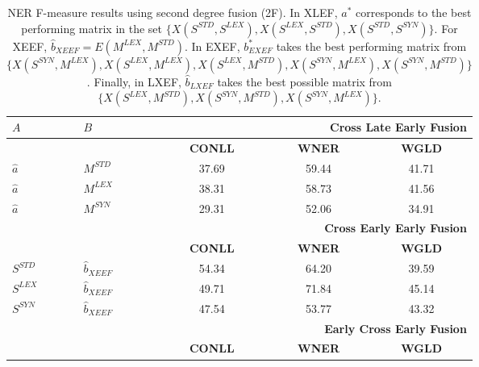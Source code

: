 \documentclass{llncs}
\newcommand\mlex{M^{\scriptscriptstyle LEX}}
\newcommand\mstd{M^{\scriptscriptstyle STD}}
\newcommand\slex{S^{\scriptscriptstyle LEX}}
\newcommand\ssyn{S^{\scriptscriptstyle SYN}}
\begin{document}
\begin{table}[!tb]
\begin{minipage}[t]{0.48\textwidth}
\caption{NER F-measure results using second degree fusion (2F). In XLEF, ${a^*}$ corresponds to the best performing matrix in the set $\{ X(S^{\scriptscriptstyle STD}, S^{\scriptscriptstyle LEX}),X(S^{\scriptscriptstyle LEX}, S^{\scriptscriptstyle STD}), \allowbreak X(S^{\scriptscriptstyle STD}, S^{\scriptscriptstyle SYN})\}$. For XEEF,  $\hat{b}_{\scriptscriptstyle XEEF}=E(\mlex, \mstd)$. In EXEF, $b^*_{\scriptscriptstyle EXEF}$  takes the best performing matrix from $\{X(\ssyn, \mlex), \allowbreak X(\slex, \mlex), X(\slex, \mstd), \allowbreak X(\ssyn, \mlex), X(\ssyn, \mstd) \}$. Finally, in LXEF, $\hat{b}_{\scriptscriptstyle LXEF}$ takes the best possible matrix from $\{X(\slex, \mstd), X(\ssyn, \mstd), \allowbreak X(\ssyn, \mlex) \}$.}
\label{tab:ner_2d}
\begin{tabular}{@{}llccc@{}}
	\toprule
	$A$                      & $B$            & \multicolumn{3}{r}{\textbf{Cross Late Early Fusion}}  \\ \midrule
	                         &                & \textbf{CONLL} & \textbf{WNER}  &             \textbf{WGLD}             \\
	\cmidrule{3-5}
$\hat{a}$ & $M^{\scriptscriptstyle STD}$      & 37.69 & 59.44 &            41.71             \\
	$\hat{a}$                & $M^{\scriptscriptstyle LEX}$      & 38.31 & 58.73 &            41.56             \\
	$\hat{a}$                & $M^{\scriptscriptstyle SYN}$      & 29.31 & 52.06 &            34.91             \\ \midrule
	                         &                & \multicolumn{3}{r}{\textbf{Cross Early Early Fusion}} \\ \midrule
	                         &                & \textbf{CONLL} & \textbf{WNER}  &             \textbf{WGLD}             \\
	\cmidrule{3-5}
$S^{\scriptscriptstyle STD}$ & $\hat{b}_{\scriptscriptstyle XEEF}$          &   54.34    &    64.20   & 39.59 \\
	$S^{\scriptscriptstyle LEX}$                &$\hat{b}_{\scriptscriptstyle XEEF}$         &  49.71     &   71.84    &  45.14\\
	$S^{\scriptscriptstyle SYN}$                & $\hat{b}_{\scriptscriptstyle XEEF}$         &  47.54     &   53.77    & 43.32 \\ \midrule
	                         &                & \multicolumn{3}{r}{\textbf{Early Cross Early Fusion}} \\ \midrule
	                         &                & \textbf{CONLL} & \textbf{WNER}  &             \textbf{WGLD}             \\

\end{tabular}
\end{minipage}
\end{table}
\end{document}

